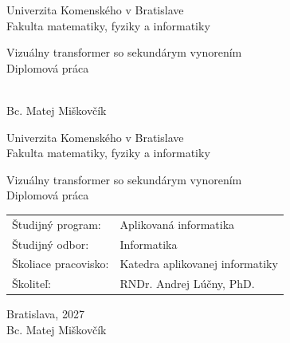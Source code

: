 \documentclass[12pt, twoside]{book}
\def\mfrok{2027}
\def\mfnazov{Vizuálny transformer so sekundárym vynorením}
\def\mftyp{Diplomová práca}
\def\mfautor{Bc. Matej Miškovčík}
\def\mfskolitel{RNDr. Andrej Lúčny, PhD.}
\def\mfmiesto{Bratislava, \mfrok}
\def\mfodbor{ Informatika}
\def\program{ Aplikovaná informatika }
\def\mfpracovisko{ Katedra aplikovanej informatiky }
\begin{document}
     
\frontmatter
\pagestyle{empty}


\begin{center}
\sc\large
Univerzita Komenského v Bratislave\\
Fakulta matematiky, fyziky a informatiky

\vfill

{\LARGE\mfnazov}\\
\mftyp
\end{center}

\vfill

{\sc\large 
\noindent \mfrok\\
\mfautor
}

\cleardoublepage



\noindent

\begin{center}
\sc  
\large
Univerzita Komenského v Bratislave\\
Fakulta matematiky, fyziky a informatiky

\vfill

{\LARGE\mfnazov}\\
\mftyp
\end{center}

\vfill

\noindent
\begin{tabular}{ll}
Študijný program: & \program \\
Študijný odbor: & \mfodbor \\
Školiace pracovisko: & \mfpracovisko \\
Školiteľ: & \mfskolitel \\
\end{tabular}

\vfill


\noindent \mfmiesto\\
\mfautor

\cleardoublepage



\newpage
\end{document}
